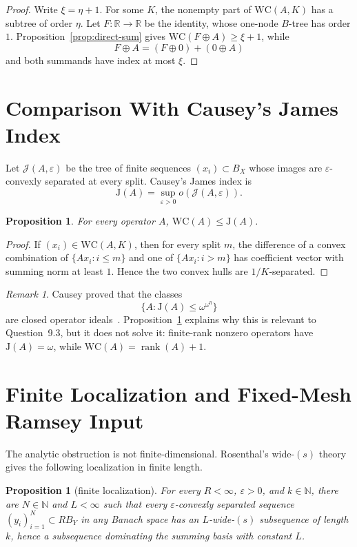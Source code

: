\documentclass[11pt]{article}
\newtheorem{proposition}[theorem]{Proposition}
\theoremstyle{definition}
\theoremstyle{remark}
\newtheorem{remark}[theorem]{Remark}
\newcommand{\WC}{\mathrm{WC}}
\newcommand{\J}{\mathrm{J}}
\newcommand{\cJ}{\mathcal J}
\newcommand{\N}{\mathbb N}
\newcommand{\R}{\mathbb R}
\newcommand{\rank}{\operatorname{rank}}
\begin{document}
\begin{proof}
Write \(\xi=\eta+1\).  For some \(K\), the nonempty part of \(\WC(A,K)\)
has a subtree of order \(\eta\).  Let \(F:\R\to\R\) be the identity, whose
one-node \(B\)-tree has order \(1\).  Proposition~\ref{prop:direct-sum}
gives \(\WC(F\oplus A)\geq\xi+1\), while
\[
F\oplus A=(F\oplus0)+(0\oplus A)
\]
and both summands have index at most \(\xi\).
\end{proof}

\section{Comparison With Causey's James Index}

Let \(\cJ(A,\varepsilon)\) be the tree of finite sequences
\((x_i)\subset B_X\) whose images are \(\varepsilon\)-convexly separated at
every split.  Causey's James index is
\[
   \J(A)=\sup_{\varepsilon>0}o(\cJ(A,\varepsilon)).
\]

\begin{proposition}\label{prop:wc-le-j}
For every operator \(A\), \(\WC(A)\leq \J(A)\).
\end{proposition}

\begin{proof}
If \((x_i)\in\WC(A,K)\), then for every split \(m\), the difference of a
convex combination of \(\{Ax_i:i\leq m\}\) and one of
\(\{Ax_i:i>m\}\) has coefficient vector with summing norm at least \(1\).
Hence the two convex hulls are \(1/K\)-separated.
\end{proof}

\begin{remark}
Causey proved that the classes
\[
   \{A:\J(A)\leq\omega^{\omega^\eta}\}
\]
are closed operator ideals~\cite{CauseyJ}.  Proposition~\ref{prop:wc-le-j}
explains why this is relevant to Question~9.3, but it does not solve it:
finite-rank nonzero operators have \(\J(A)=\omega\), while
\(\WC(A)=\rank(A)+1\).
\end{remark}

\section{Finite Localization and Fixed-Mesh Ramsey Input}

The analytic obstruction is not finite-dimensional.  Rosenthal's
wide-\((s)\) theory gives the following localization in finite length.

\begin{proposition}[finite localization]\label{prop:localization}
For every \(R<\infty\), \(\varepsilon>0\), and \(k\in\N\), there are
\(N\in\N\) and \(L<\infty\) such that every \(\varepsilon\)-convexly
separated sequence \((y_i)_{i=1}^N\subset R B_Y\) in any Banach space has an
\(L\)-wide-\((s)\) subsequence of length \(k\), hence a subsequence
dominating the summing basis with constant \(L\).
\end{proposition}
\end{document}
